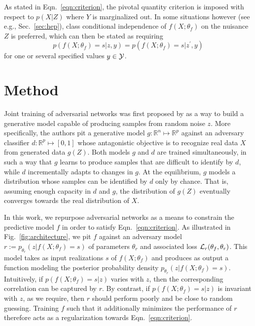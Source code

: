\documentclass{article}
\theoremstyle{plain}
\begin{document}
As stated in Eqn.~\ref{eqn:criterion}, the pivotal quantity criterion is
imposed with respect to $p(X|Z)$ where $Y$ is marginalized out. In some situations
however (see e.g., Sec.~\ref{sec:hep}), class conditional independence of $f(X;
\theta_f)$ on the nuisance $Z$ is preferred, which can then be stated as
requiring
\begin{equation}\label{eqn:criterion-class}
    p(f(X ; \theta_f) = s | z, y ) = p(f(X ; \theta_f) = s | z^\prime, y )
\end{equation}
for one or several specified values $y \in {\cal Y}$.



\section{Method}
\label{sec:method}

Joint training of adversarial networks was first proposed by \citep{goodfellow2014generative} as a
way to build a generative model capable of producing samples from random noise
$z$. More specifically, the authors pit a generative model $g:
\mathbb{R}^n \mapsto \mathbb{R}^p$ against an adversary classifier $d :
\mathbb{R}^p \mapsto [0, 1]$ whose antagonistic objective is to recognize
real data $X$ from generated data $g(Z)$. Both models $g$ and $d$ are trained
simultaneously, in such a way that $g$ learns to produce samples that are
difficult to identify by $d$, while $d$ incrementally adapts to changes in $g$.
At the equilibrium, $g$ models a distribution whose samples can be identified by
$d$ only by chance. That is, assuming enough capacity in $d$ and  $g$, the
distribution of $g(Z)$ eventually converges towards the real distribution
of $X$.

In this work, we repurpose adversarial networks as a means to constrain the
predictive model $f$ in order to satisfy Eqn.~\ref{eqn:criterion}. As
illustrated in Fig.~\ref{fig:architecture}, we pit $f$ against an adversary
model $r := p_{\theta_r}(z | f(X;\theta_f)=s)$ of parameters $\theta_r$ and
associated loss ${\cal L}_r(\theta_f, \theta_r)$. This model takes  as input
realizations $s$ of $f(X; \theta_f)$ and produces as output a function
modeling the posterior probability density $p_{\theta_r}(z | f(X;\theta_f)=s)$.
Intuitively, if $p(f(X; \theta_f)=s|z)$ varies with $z$,
then the corresponding correlation can be captured by $r$. By contrast, if
$p(f(X; \theta_f)=s|z)$ is invariant with $z$, as we require, then $r$ should
perform poorly and be close to random guessing. Training $f$ such that it
additionally minimizes the performance of $r$ therefore acts as a regularization
towards Eqn.~\ref{eqn:criterion}.
\end{document}
